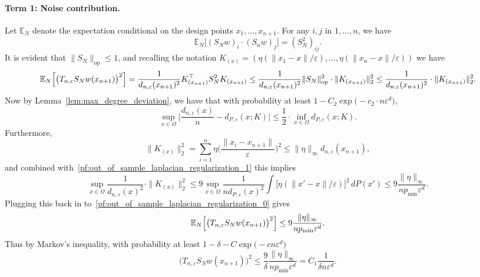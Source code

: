 \documentclass{article}
\newcommand{\1}{\mathbf{1}}
\newcommand{\Ebb}{\mathbb{E}}
\theoremstyle{alden}
\theoremstyle{aldenthm}
\theoremstyle{definition}
\theoremstyle{remark}
\begin{document}
\paragraph{Term 1: Noise contribution.}
Let $\Ebb_N$ denote the expectation conditional on the design points $x_1,\ldots,x_{n + 1}$. For any $i,j$ in $1,\ldots,n$, we have
\begin{equation*}
\Ebb_N\bigl[(S_Nw)_i \cdot (S_nw)_j\bigr] = (S_N^2)_{ij}.
\end{equation*}
It is evident that $\|S_N\|_{\textrm{op}} \leq 1$, and recalling the notation $K_{(x)} = (\eta(\|x_1 - x\|/\varepsilon),\ldots,\eta(\|x_n - x\|/\varepsilon))$ we have
\begin{equation}
\label{pf:out_of_sample_laplacian_regularization_0}
\Ebb_N\Bigl[\bigl(T_{n,\varepsilon}S_Nw(x_{n + 1})\bigr)^2\Bigr] = \frac{1}{d_{n,\varepsilon}(x_{n + 1})^2} K_{(x_{n + 1})}^{\top} S_N^2 K_{(x_{n + 1})} \leq \frac{1}{d_{n,\varepsilon}(x_{n + 1})^2} \|S_N\|_{\textrm{op}}^2 \cdot \|K_{(x_{n + 1})}\|_2^2 \leq \frac{1}{d_{n,\varepsilon}(x_{n + 1})^2} \cdot \|K_{(x_{n + 1})}\|_2^2.
\end{equation}
Now by Lemma~\ref{lem:max_degree_deviation}, we have that with probability at least $1 - C_2\exp\bigl(-c_2 \cdot n \varepsilon^d\bigr)$,
\begin{equation}
\label{pf:out_of_sample_laplacian_regularization_1}
\sup_{x \in \Omega} \biggl|\frac{d_{n,\varepsilon}(x)}{n} - d_{P,\varepsilon}(x; K)\biggr| \leq \frac{1}{2} \cdot \inf_{x \in \Omega} d_{P,\varepsilon}(x; K).
\end{equation}
Furthermore,
\begin{equation*}
\|K_{(x)}\|_2^2 = \sum_{i = 1}^{n} \eta\biggl(\frac{\|x_i - x_{n + 1}\|}{\varepsilon}\biggr)^2 \leq \|\eta\|_{\infty} d_{n,\varepsilon}(x_{n + 1}),
\end{equation*}
and combined with~\eqref{pf:out_of_sample_laplacian_regularization_1} this implies
\begin{equation*}
\sup_{x \in \Omega}\frac{1}{d_{n,\varepsilon}(x)^2} \cdot \|K_{(x)}\|_2^2 \leq 9 \sup_{x \in \Omega} \frac{1}{nd_{P,\varepsilon}(x)^2} \int \bigl[\eta(\|x'-x\|/\varepsilon)\bigr]^2 \,dP(x') \leq 9\frac{\|\eta\|_{\infty}}{n p_{\min} \varepsilon^d}.
\end{equation*}
Plugging this back in to~\eqref{pf:out_of_sample_laplacian_regularization_0} gives
\begin{equation*}
\Ebb_N\Bigl[\bigl(T_{n,\varepsilon}S_Nw(x_{n + 1})\bigr)^2\Bigr] \leq 9\frac{\|\eta\|_{\infty}}{n p_{\min} \varepsilon^d}.
\end{equation*}
Thus by Markov's inequality, with probability at least $1 - \delta - C\exp\bigl(-c n \varepsilon^d\bigr)$
\begin{equation*}
\bigl(T_{n,\varepsilon}S_Nw(x_{n + 1})\bigr)^2 \leq \frac{9}{\delta}\frac{\|\eta\|_{\infty}}{n p_{\min} \varepsilon^d} = C_1\frac{1}{\delta n\varepsilon^d}.
\end{equation*}
\end{document}
